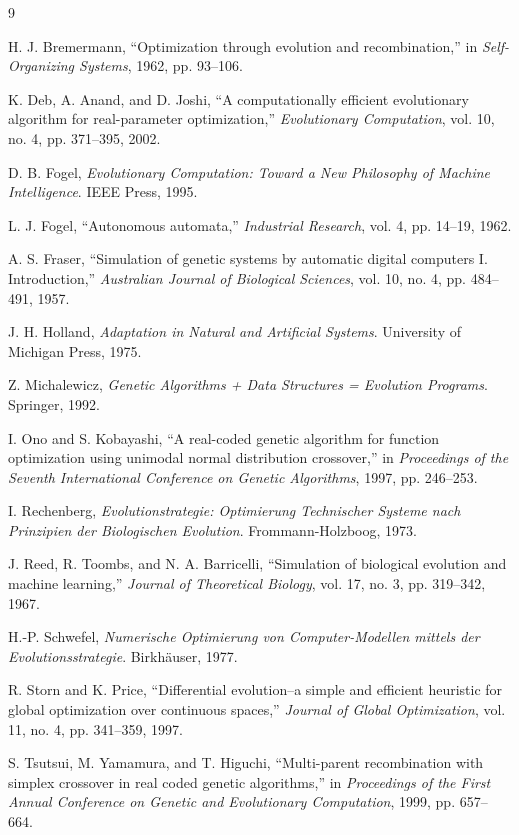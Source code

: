 \documentclass[conference]{IEEEtran}
\begin{document}
\begin{thebibliography}{9}

H. J. Bremermann, ``Optimization through evolution and recombination,'' in \textit{Self-Organizing Systems}, 1962, pp. 93--106.

K. Deb, A. Anand, and D. Joshi, ``A computationally efficient evolutionary algorithm for real-parameter optimization,'' \textit{Evolutionary Computation}, vol. 10, no. 4, pp. 371--395, 2002.

D. B. Fogel, \textit{Evolutionary Computation: Toward a New Philosophy of Machine Intelligence}. IEEE Press, 1995.

L. J. Fogel, ``Autonomous automata,'' \textit{Industrial Research}, vol. 4, pp. 14--19, 1962.

A. S. Fraser, ``Simulation of genetic systems by automatic digital computers I. Introduction,'' \textit{Australian Journal of Biological Sciences}, vol. 10, no. 4, pp. 484--491, 1957.

J. H. Holland, \textit{Adaptation in Natural and Artificial Systems}. University of Michigan Press, 1975.

Z. Michalewicz, \textit{Genetic Algorithms + Data Structures = Evolution Programs}. Springer, 1992.

I. Ono and S. Kobayashi, ``A real-coded genetic algorithm for function optimization using unimodal normal distribution crossover,'' in \textit{Proceedings of the Seventh International Conference on Genetic Algorithms}, 1997, pp. 246--253.

I. Rechenberg, \textit{Evolutionstrategie: Optimierung Technischer Systeme nach Prinzipien der Biologischen Evolution}. Frommann-Holzboog, 1973.

J. Reed, R. Toombs, and N. A. Barricelli, ``Simulation of biological evolution and machine learning,'' \textit{Journal of Theoretical Biology}, vol. 17, no. 3, pp. 319--342, 1967.

H.-P. Schwefel, \textit{Numerische Optimierung von Computer-Modellen mittels der Evolutionsstrategie}. Birkh\"{a}user, 1977.

R. Storn and K. Price, ``Differential evolution--a simple and efficient heuristic for global optimization over continuous spaces,'' \textit{Journal of Global Optimization}, vol. 11, no. 4, pp. 341--359, 1997.

S. Tsutsui, M. Yamamura, and T. Higuchi, ``Multi-parent recombination with simplex crossover in real coded genetic algorithms,'' in \textit{Proceedings of the First Annual Conference on Genetic and Evolutionary Computation}, 1999, pp. 657--664.

\end{thebibliography}
\end{document}
